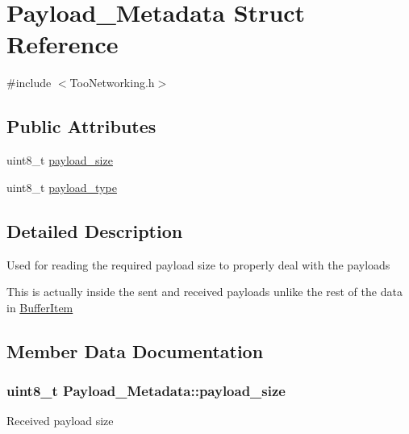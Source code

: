\hypertarget{structPayload__Metadata}{}\section{Payload\+\_\+\+Metadata Struct Reference}
\label{structPayload__Metadata}


{\ttfamily \#include $<$Too\+Networking.\+h$>$}

\subsection*{Public Attributes}
\begin{DoxyCompactItemize}
\item 
uint8\+\_\+t \hyperlink{structPayload__Metadata_a5d517fb1e486f468bef3f42b93b6707d}{payload\+\_\+size}
\item 
uint8\+\_\+t \hyperlink{structPayload__Metadata_a5009210cc0592eda44bd9fd05b17d2a8}{payload\+\_\+type}
\end{DoxyCompactItemize}


\subsection{Detailed Description}
Used for reading the required payload size to properly deal with the payloads

This is actually inside the sent and received payloads unlike the rest of the data in \hyperlink{structBufferItem}{Buffer\+Item} 

\subsection{Member Data Documentation}
\subsubsection[{\texorpdfstring{payload\+\_\+size}{payload_size}}]{\setlength{\rightskip}{0pt plus 5cm}uint8\+\_\+t Payload\+\_\+\+Metadata\+::payload\+\_\+size}\hypertarget{structPayload__Metadata_a5d517fb1e486f468bef3f42b93b6707d}{}\label{structPayload__Metadata_a5d517fb1e486f468bef3f42b93b6707d}
Received payload size 
